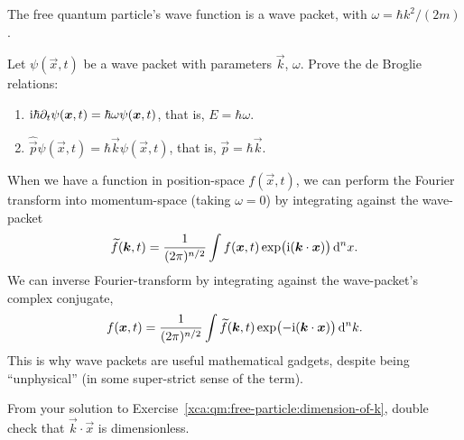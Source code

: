 \begin{example}
  The free quantum particle's wave function is a wave packet, with
  $\omega = \hbar k^{2}/(2m)$.
\end{example}

\begin{exercise}\label{xca:qm:free-particle:de-broglie-relations}
Let $\psi(\vec{x},t)$ be a wave packet with parameters $\vec{k}$,
$\omega$. Prove the de Broglie relations: 
\begin{enumerate}
\item $\mathrm{i}\hbar\partial_{t}\psi(\boldsymbol{x},t) = \hbar\omega\psi(\boldsymbol{x},t)$,
  that is, $E=\hbar\omega$.
\item $\widehat{\vec{p}}\psi(\vec{x},t) = \hbar\vec{k}\psi(\vec{x},t)$,
  that is, $\vec{p}=\hbar\vec{k}$.
\end{enumerate}
\end{exercise}

When we have a function in position-space $f(\vec{x},t)$, we can perform
the Fourier transform into momentum-space (taking $\omega=0$) by
integrating against the wave-packet
\begin{equation}
\widetilde{f}(\boldsymbol{k}, t) = \frac{1}{(2\pi)^{n/2}}\int f(\boldsymbol{x},t)\exp\bigl(\mathrm{i}(\boldsymbol{k}\cdot\boldsymbol{x})\bigr)\,\mathrm{d}^{n}x.
\end{equation}
We can inverse Fourier-transform by integrating against the
wave-packet's complex conjugate,
\begin{equation}
f(\boldsymbol{x},t) = \frac{1}{(2\pi)^{n/2}}\int \widetilde{f}(\boldsymbol{k}, t)\exp\bigl(-\mathrm{i}(\boldsymbol{k}\cdot\boldsymbol{x})\bigr)\,\mathrm{d}^{n}k.
\end{equation}
This is why wave packets are useful mathematical gadgets, despite being
``unphysical'' (in some super-strict sense of the term).

\begin{exercise}
From your solution to Exercise~\ref{xca:qm:free-particle:dimension-of-k},
double check that $\vec{k}\cdot\vec{x}$ is dimensionless.
\end{exercise}
